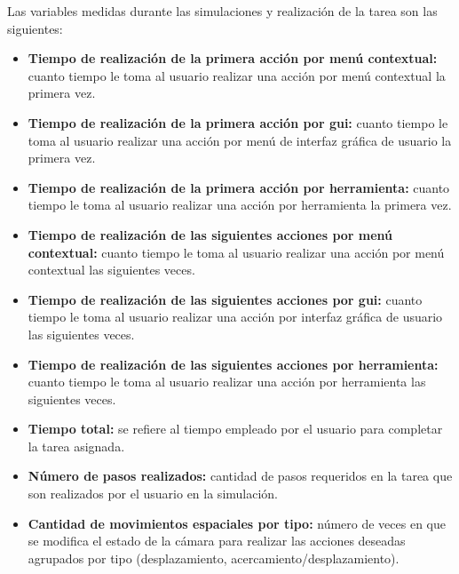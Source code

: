 Las variables medidas durante las simulaciones y realización de la tarea son las
siguientes:

\begin{itemize}

\item \textbf{Tiempo de realización de la primera acción por menú contextual:} 
    cuanto tiempo le toma al usuario realizar una acción por menú contextual la 
    primera vez.

\item \textbf{Tiempo de realización de la primera acción por \Gls{gui}:} cuanto 
    tiempo le toma al usuario realizar una acción por menú de 
    interfaz gráfica de usuario la primera vez.
    
\item \textbf{Tiempo de realización de la primera acción por herramienta:} cuanto 
    tiempo le toma al usuario realizar una acción por herramienta la primera vez.
    
\item \textbf{Tiempo de realización de las siguientes acciones por menú contextual:} 
    cuanto tiempo le toma al usuario realizar una acción por menú 
    contextual las siguientes veces.

\item \textbf{Tiempo de realización de las siguientes acciones por \Gls{gui}:} 
    cuanto tiempo le toma al usuario realizar una acción 
    por interfaz gráfica de usuario las siguientes veces.

\item \textbf{Tiempo de realización de las siguientes acciones por herramienta:} 
    cuanto tiempo le toma al usuario realizar una acción por herramienta 
    las siguientes veces.

\item \textbf{Tiempo total:} se refiere al tiempo empleado por el usuario para 
    completar la tarea asignada.

\item \textbf{Número de pasos realizados:} cantidad de pasos requeridos en la tarea 
    que son realizados por el usuario en la simulación. 

\item \textbf{Cantidad de movimientos espaciales por tipo:} número de veces en que se 
    modifica el estado de la cámara para realizar las acciones deseadas agrupados por 
    tipo (desplazamiento, acercamiento/desplazamiento).

\end{itemize}

